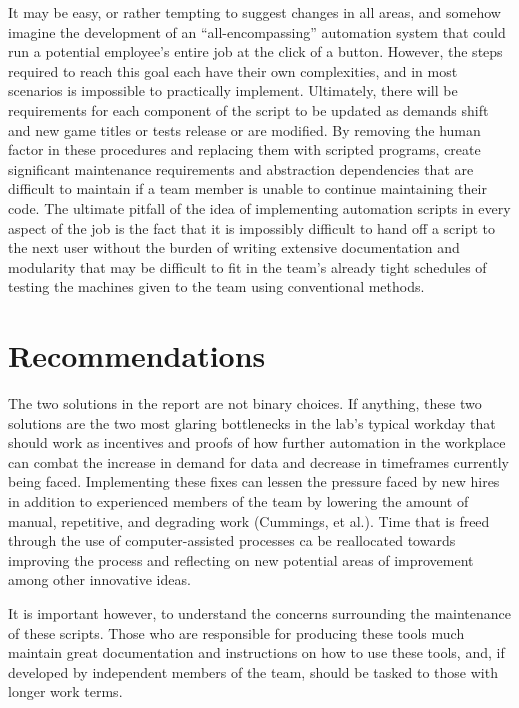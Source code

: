\documentclass[12pt]{article}
\begin{document}
\indent\hspace{0.5in} It may be easy, or rather tempting to suggest changes in all areas, and somehow imagine the development of an “all-encompassing” automation system that could run a potential employee's entire job at the click of a button. However, the steps required to reach this goal each have their own complexities, and in most scenarios is impossible to practically implement. Ultimately, there will be requirements for each component of the script to be updated as demands shift and new game titles or tests release or are modified. By removing the human factor in these procedures and replacing them with scripted programs, create significant maintenance requirements and abstraction dependencies that are difficult to maintain if a team member is unable to continue maintaining their code. The ultimate pitfall of the idea of implementing automation scripts in every aspect of the job is the fact that it is impossibly difficult to hand off a script to the next user without the burden of writing extensive documentation and modularity that may be difficult to fit in the team's already tight schedules of testing the machines given to the team using conventional methods.

\newpage
\section{Recommendations}


\indent\hspace{0.5in} The two solutions in the report are not binary choices. If anything, these two solutions are the two most glaring bottlenecks in the lab’s typical workday that should work as incentives and proofs of how further automation in the workplace can combat the increase in demand for data and decrease in timeframes currently being faced. Implementing these fixes can lessen the pressure faced by new hires in addition to experienced members of the team by lowering the amount of manual, repetitive, and degrading work (Cummings, et al.). Time that is freed through the use of computer-assisted processes ca be reallocated towards improving the process and reflecting on new potential areas of improvement among other innovative ideas.

\indent\hspace{0.5in} It is important however, to understand the concerns surrounding the maintenance of these scripts. Those who are responsible for producing these tools much maintain great documentation and instructions on how to use these tools, and, if developed by independent members of the team, should be tasked to those with longer work terms.  
\end{document}
